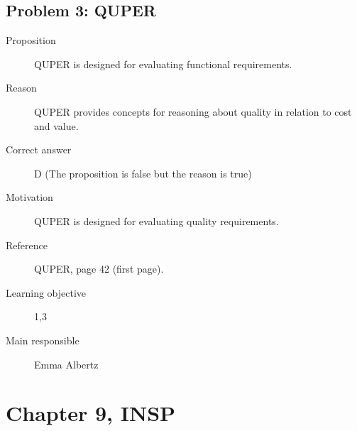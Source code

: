 \documentclass[10pt,a4paper]{article}
\begin{document}
\subsection*{Problem 3: QUPER}
\begin{description}
\item[Proposition] QUPER is designed for evaluating functional requirements.
\item[Reason] QUPER provides concepts for reasoning about quality in relation to cost and value. 
\item[Correct answer] D (The proposition is false but the reason is true)
\item[Motivation] QUPER is designed for evaluating quality requirements. 
\item[Reference] QUPER, page 42 (first page).
\item[Learning objective] 1,3
\item[Main responsible] Emma Albertz
\end{description}


\section*{Chapter 9, INSP}
\end{document}
